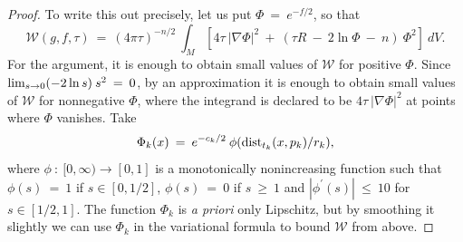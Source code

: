 \begin{proof}
To write this out precisely, let us put $\Phi \: = \: e^{- f/2}$, so
that
\begin{equation}
{\mathcal W}(g, f, \tau) \: = \: (4 \pi \tau)^{-n/2} \:
\int_M \left[ 4 \tau \: |\nabla \Phi|^2 \: + \:
( \tau R \: - \: 2 \ln \Phi
\: - \: n ) \: \Phi^2 \right] \: dV.
\end{equation}
For the argument, it is enough to obtain small values of ${\mathcal W}$ for
positive $\Phi$.   Since $\lim_{s\rightarrow 0}(-2\ln s)\:s^2\:=\:0$,
by an approximation it is enough to obtain small values of ${\mathcal W}$ for
nonnegative $\Phi$, where the integrand is declared to be
$4 \tau \: |\nabla \Phi|^2$ at points where $\Phi$ vanishes. Take
\begin{equation}
\Phi_k(x) \: = \: e^{- c_k/2} \: \phi(\operatorname{dist}_{t_k}(x, p_k)/r_k),
\end{equation}
where $\phi \: : \: [0, \infty) \rightarrow [0, 1]$ is
a monotonically nonincreasing function such that
$\phi(s) \: = \: 1$ if $s \in [0, 1/2]$, $\phi(s) \: = \: 0$ if $s \: \ge \: 1$
and $|\phi^\prime(s)| \: \le \: 10$ for $s \in [1/2, 1]$.
The function $\Phi_k$ is {\it a priori} only Lipschitz, but by smoothing
it slightly we can use $\Phi_k$ in the variational formula
to bound ${\mathcal W}$ from above.


\end{proof}

